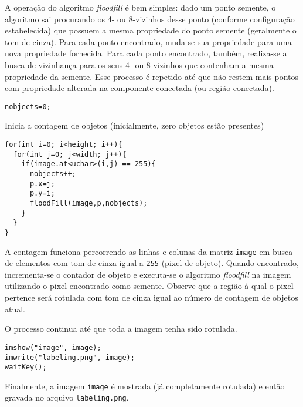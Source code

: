 \documentclass[11pt]{amsbook}
\begin{document}
A operação do algoritmo \emph{floodfill} é bem simples: dado um ponto
semente, o algoritmo sai procurando os 4- ou 8-vizinhos desse ponto
(conforme configuração estabelecida) que possuem a mesma propriedade
do ponto semente (geralmente o tom de cinza). Para cada ponto
encontrado, muda-se sua propriedade para uma nova propriedade
fornecida. Para cada ponto encontrado, também, realiza-se a busca de
vizinhança para os seus 4- ou 8-vizinhos que contenham a mesma
propriedade da semente. Esse processo é repetido até que não restem
mais pontos com propriedade alterada na componente conectada (ou
região conectada).


\begin{verbatim}
nobjects=0;
\end{verbatim}

Inicia a contagem de objetos (inicialmente, zero objetos estão
presentes)


\begin{verbatim}
for(int i=0; i<height; i++){
  for(int j=0; j<width; j++){
    if(image.at<uchar>(i,j) == 255){
      nobjects++;
      p.x=j;
      p.y=i;
      floodFill(image,p,nobjects);
    }
  }
}
\end{verbatim}

A contagem funciona percorrendo as linhas e colunas da matriz \texttt{image}
em busca de elementos com tom de cinza igual a \texttt{255} (pixel de
objeto). Quando encontrado, incrementa-se o contador de objeto e
executa-se o algoritmo \emph{floodfill} na imagem utilizando o pixel
encontrado como semente. Observe que a região à qual o pixel pertence
será rotulada com tom de cinza igual ao número de contagem de objetos
atual.


O processo continua até que toda a imagem tenha sido rotulada.


\begin{verbatim}
imshow("image", image);
imwrite("labeling.png", image);
waitKey();
\end{verbatim}

Finalmente, a imagem \texttt{image} é mostrada (já completamente rotulada) e
então gravada no arquivo \texttt{labeling.png}.
\end{document}
